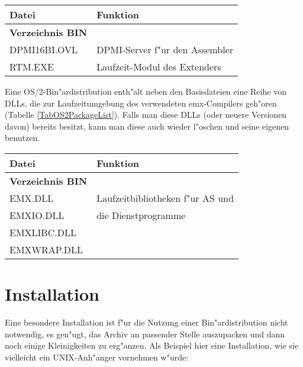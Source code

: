 \documentclass[12pt,a4paper,twoside]{report}
\begin{document}
\begin{table*}[htp]
\begin{center}\begin{tabular}{|l|l|}
\hline
Datei             & Funktion \\
\hline
\hline
{\bf Verzeichnis BIN} & \\
\hline
DPMI16BI.OVL   & DPMI-Server f"ur den Assembler \\
RTM.EXE        & Laufzeit-Modul des Extenders \\
\hline
\end{tabular}\end{center}
\caption{Zus"atzliche Dateien in einer DPMI-Bin"ardistribution
         \label{TabDPMIPackageList}}
\end{table*}

Eine OS/2-Bin"ardistribution  enth"alt neben den
Basisdateien eine Reihe von DLLs, die zur Laufzeitumgebung des verwendeten
emx-Compilers geh"oren (Tabelle \ref{TabOS2PackageList}).  Falls man diese
DLLs (oder neuere Versionen davon) bereits besitzt, kann man diese auch
wieder l"oschen und seine eigenen benutzen.

\begin{table*}[htp]
\begin{center}\begin{tabular}{|l|l|}
\hline
Datei             & Funktion \\
\hline
\hline
{\bf Verzeichnis BIN} & \\
\hline
EMX.DLL           & Laufzeitbibliotheken f"ur AS und \\
EMXIO.DLL         & die Dienstprogramme \\
EMXLIBC.DLL       & \\
EMXWRAP.DLL       & \\
\hline
\end{tabular}\end{center}
\caption{Zus"atzliche Dateien in einer OS/2-Bin"ardistribution
         \label{TabOS2PackageList}}
\end{table*}


\section{Installation}

Eine besondere  Installation ist f"ur die Nutzung
einer Bin"ardistribution nicht notwendig, es gen"ugt, das Archiv an
passender Stelle auszupacken und dann noch einige Kleinigkeiten zu
erg"anzen.  Als Beispiel hier eine Installation, wie sie vielleicht
ein UNIX-Anh"anger vornehmen w"urde:
\end{document}
